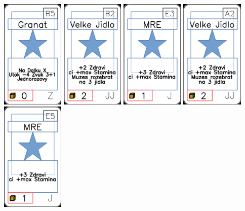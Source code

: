 \documentclass[a4paper]{article}
\begin{document}
	\includegraphics[width=3.0cm]{img-1_99}
	\includegraphics[width=3.0cm]{img-1_36}
	\includegraphics[width=3.0cm]{img-1_22}
	\includegraphics[width=3.0cm]{img-1_31}
	\includegraphics[width=3.0cm]{img-1_24}
\end{document}
